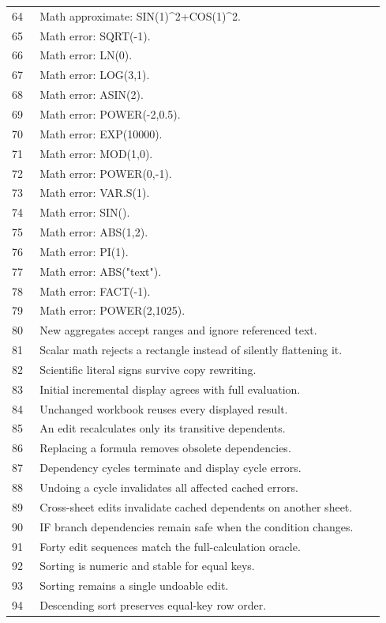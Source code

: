 \documentclass[11pt,letterpaper]{article}
\begin{document}
\begin{longtable}{@{}P{0.07\linewidth}P{0.87\linewidth}@{}}
64 & Math approximate: SIN(1)\textasciicircum{}2+COS(1)\textasciicircum{}2.\\
65 & Math error: SQRT(-1).\\
66 & Math error: LN(0).\\
67 & Math error: LOG(3,1).\\
68 & Math error: ASIN(2).\\
69 & Math error: POWER(-2,0.5).\\
70 & Math error: EXP(10000).\\
71 & Math error: MOD(1,0).\\
72 & Math error: POWER(0,-1).\\
73 & Math error: VAR.S(1).\\
74 & Math error: SIN().\\
75 & Math error: ABS(1,2).\\
76 & Math error: PI(1).\\
77 & Math error: ABS("text").\\
78 & Math error: FACT(-1).\\
79 & Math error: POWER(2,1025).\\
80 & New aggregates accept ranges and ignore referenced text.\\
81 & Scalar math rejects a rectangle instead of silently flattening it.\\
82 & Scientific literal signs survive copy rewriting.\\
83 & Initial incremental display agrees with full evaluation.\\
84 & Unchanged workbook reuses every displayed result.\\
85 & An edit recalculates only its transitive dependents.\\
86 & Replacing a formula removes obsolete dependencies.\\
87 & Dependency cycles terminate and display cycle errors.\\
88 & Undoing a cycle invalidates all affected cached errors.\\
89 & Cross-sheet edits invalidate cached dependents on another sheet.\\
90 & IF branch dependencies remain safe when the condition changes.\\
91 & Forty edit sequences match the full-calculation oracle.\\
92 & Sorting is numeric and stable for equal keys.\\
93 & Sorting remains a single undoable edit.\\
94 & Descending sort preserves equal-key row order.\\

\end{longtable}
\end{document}
